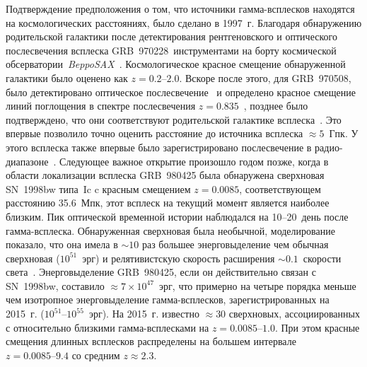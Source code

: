 Подтверждение предположения о том, что источники гамма-всплесков находятся на космологических расстояниях,
было сделано в 1997~г. Благодаря обнаружению родительской галактики после детектирования 
рентгеновского и оптического послесвечения всплеска GRB~970228\footnotemark\ инструментами на 
борту космической обсерватории~\textit{BeppoSAX}~\citep{Costa1997Natur, van_Paradijs_1997Natur}.
Космологическое красное смещение обнаруженной галактики было оценено как $z=0.2\mbox{--}2.0$.
Вскоре после этого, для GRB~970508, было детектировано оптическое послесвечение~\citep{Djorgovski_1997Natur} 
и определено красное смещение линий поглощения в спектре послесвечения
$z=0.835$~\citep{Metzger_1997Natur, Reichart_1998ApJ}, позднее было подтверждено, 
что они соответствуют родительской галактике всплеска~\citep{Fruchter_2000ApJ}. 
Это впервые позволило точно оценить расстояние до источника всплеска $\approx 5$~Гпк. 
У этого всплеска также впервые было зарегистрировано послесвечение в радио-диапазоне~\citep{Frail_1997Natur}.
Следующее важное открытие произошло годом позже, когда в области локализации 
всплеска GRB~980425 была обнаружена сверхновая SN~1998bw типа~Ic c красным смещением $z=0.0085$,
соответствующем расстоянию 35.6~Мпк, этот всплеск на текущий момент является наиболее близким.
Пик оптической временной истории наблюдался на 10--20~день после гамма-всплеска.
Обнаруженная сверхновая была необычной, моделирование показало, что она 
имела в $\sim 10$ раз большее энерговыделение чем обычная 
сверхновая ($10^{51}$~эрг) и релятивистскую скорость расширения 
$\sim 0.1$~скорости света~\citep{Hjorth_and_Bloom_2012in_book}. 
Энерговыделение GRB~980425, если он действительно связан с SN~1998bw, составило 
$\approx 7\times 10^{47}$~эрг, что примерно на четыре порядка меньше чем изотропное энерговыделение 
гамма-всплесков, зарегистрированных на 2015~г. ($10^{51}$--$10^{55}$~эрг).
На 2015~г. известно $\approx 30$ сверхновых, ассоциированных с относительно близкими 
гамма-всплесками на $z=0.0085\mbox{--}1.0$.
При этом красные смещения длинных всплесков распределены на большем интервале $z=0.0085\mbox{--}9.4$ 
со средним $z\approx 2.3$.


